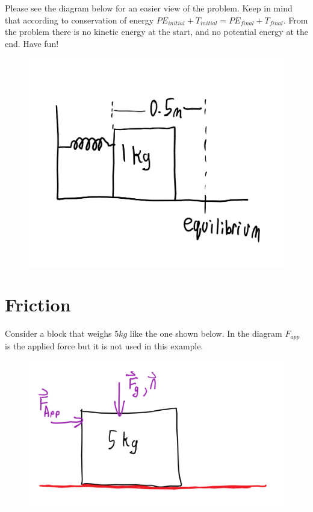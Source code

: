 \documentclass[12pt]{article}
\begin{document}
Please see the diagram below for an easier view of the problem. Keep in mind that according to conservation of energy $PE_{initial} + T_{initial} = PE_{final} + T_{final}$. From the problem there is no kinetic energy at the start, and no potential energy at the end. Have fun!

\begin{figure}[h]
\includegraphics[scale=0.25]{energy_spring.png}
\end{figure}

\parbox[][10cm][t]{8cm}{}

\section{Friction}
Consider a block that weighs $5kg$ like the one shown below. In the diagram $F_{app}$ is the applied force but it is not used in this example.

\begin{figure}[h]
\includegraphics[scale=0.25]{energy_friction.png}
\end{figure}
\end{document}
